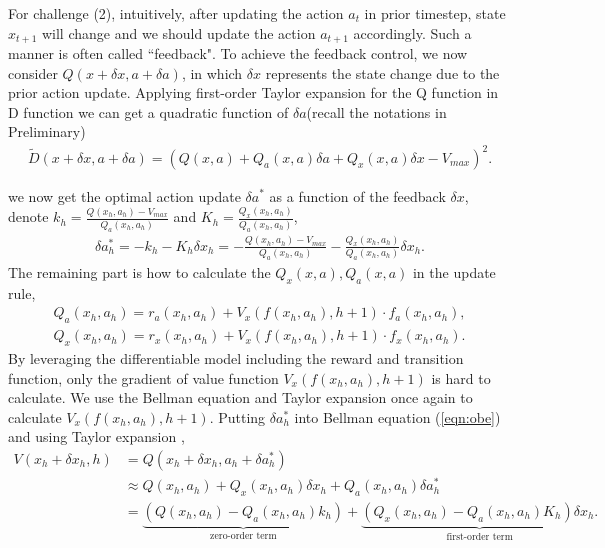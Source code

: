 \documentclass{article} %
\newcommand{\vmax}{V_{max}}
\begin{document}
For  challenge (2), intuitively, after updating the action $a_t$ in prior timestep, state $x_{t+1}$ will change and we should update the action $a_{t+1}$ accordingly. Such a manner is often called ``feedback". To achieve the feedback control, we now consider $Q(x+\delta x, a+\delta a)$, in which $\delta x $ represents the state change due to the prior action update.
Applying first-order Taylor expansion for the Q function in D function we can get a quadratic function of $\delta a$(recall the notations in Preliminary)
\begin{align}
    \tilde{D}(x +\delta x,a+\delta a) = (Q(x,a) + Q_a(x,a)\delta a + Q_x(x,a)\delta x - \vmax)^2.
\end{align}

we now get the optimal action update $\delta a^*$ as a function of the feedback $\delta x$, denote $k_h =\frac{Q(x_h,a_h)- \vmax}{Q_a (x_h,a_h)} $ and $K_h = \frac{Q_x(x_h,a_h)}{Q_a(x_h,a_h)}$,
\begin{align}
\label{eqa_term}
    \delta a^*_h 
    = -k_h - K_h \delta x_h =-\frac{Q(x_h,a_h)- \vmax}{Q_a (x_h,a_h)} - \frac{Q_x(x_h,a_h)}{Q_a(x_h,a_h)}\delta x_h .
\end{align} 
The remaining part is how to calculate the $Q_x(x,a), Q_a(x,a)$ in the update rule,  
\begin{align}
\label{eqa_dqda}
    Q_a(x_h,a_h) = r_a(x_h,a_h) + V_x(f(x_h,a_h), h+1) \cdot f_a(x_h, a_h), \\
    \label{eqa_dqdx}
    Q_x(x_h,a_h) = r_x(x_h,a_h) + V_x(f(x_h,a_h), h+1) \cdot f_x(x_h, a_h).
\end{align}
By leveraging the differentiable model including the reward and transition function, only the gradient of value function $V_x(f(x_h,a_h), h+1)$ is hard to calculate.
We use the Bellman equation and Taylor expansion once again to calculate $V_x(f(x_h, a_h),h+1)$. 
 Putting $\delta a^*_h$ into Bellman equation (\ref{eqn:obe}) and using Taylor expansion , 
\begin{align}
   V(x_h +\delta x_h , h)   &= Q(x_h + \delta x_h , a_h +\delta a^*_h) \\
                            &\approx Q(x_h, a_h) +  Q_x(x_h, a_h)\delta x_h + Q_a(x_h, a_h) \delta a_h^* \\
                            &=  \underbrace{(Q(x_h, a_h) - Q_a(x_h,a_h)k_h)}_{\text{zero-order term}} + \underbrace{(Q_x(x_h, a_h) - Q_a(x_h, a_h)K_h)\delta  x_h.}_{\text{first-order term}}  
\end{align}
\end{document}
